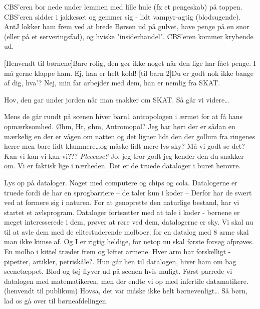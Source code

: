 \documentclass[a4paper,12pt]{article}
\begin{document}
\begin{sketch}
\scene CBS'eren bor nede under lemmen med lille hule (fx et pengeskab) på toppen. CBS'eren sidder i jakkesæt og gemmer sig - lidt vampyr-agtig (blodsugende). AntJ lokker ham frem ved at brede Børsen ud på gulvet, have penge på en snor (eller på et serveringsfad), og hviske "insiderhandel". CBS'eren kommer krybende ud.

[Henvendt til børnene]Bare rolig, den gør ikke noget når den lige har fået penge. I må gerne klappe ham.
Ej, han er helt kold!
[til barn 2]Du er godt nok ikke bange af dig, hva'?
Nej, min far arbejder med dem, han er nemlig fra SKAT.

Hov, den gar under jorden når man snakker om SKAT. Så går vi videre\ldots

\scene Mens de går rundt på scenen hiver barn1 antropologen i ærmet for at få hans opmærksomhed. 
Øhm, Hr, øhm, Antromopol? Jeg har hørt der er sådan en mærkelig en der er vågen om natten og det ligner lidt den der gollum fra ringenes herre men bare lidt klammere\ldots og måske lidt mere lys-sky? Må vi godt se det? Kan vi kan vi kan vi??? \emph{Pleeease?}
Jo, jeg tror godt jeg kender den du snakker om. Vi er faktisk lige i nærheden. Det er de truede dataloger i buret herovre. 

\scene Lys op på dataloger. Noget med computere og chips og cola.
Datalogerne er truede fordi de har en sprogbarriere -- de taler kun i koder --
Derfor har de svært ved at formere sig i naturen. For at genoprette den naturlige bestand, har vi startet et avlsprogram. 
\scene Dataloger fortsætter med at tale i koder - børnene er meget interesserede i dem, prøver at røre ved dem, datalogerne er sky. 
Vi skal nu til at avle dem med de elitestuderende molboer, for en datalog med 8 arme skal man ikke kimse af. Og I er rigtig heldige, for netop nu skal første forsøg afprøves.
\scene En molbo i kittel træder frem og løfter armene. Hver arm har forskelligt - pipetter, artikler, petriskåle?. Hun går hen til datalogen, hiver ham om bag scenetæppet. Blod og tøj flyver ud på scenen hvis muligt. 
 Først parrede vi datalogen med matematikeren, men der endte vi op med infertile datamatikere. 
(henvendt til publikum) Hovsa, det var måske ikke helt børnevenligt\ldots
{}Så børn, lad os gå over til børneafdelingen.


\end{sketch}
\end{document}
